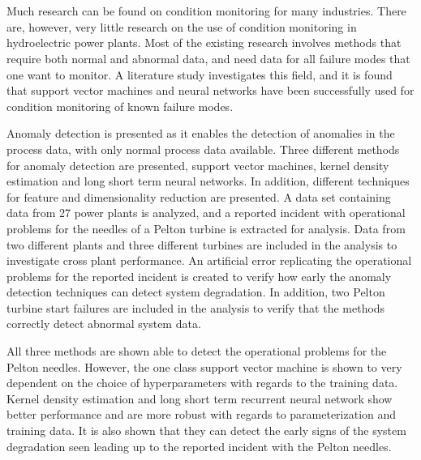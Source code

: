 \chapter*{\englishabstractname}

Much research can be found on condition monitoring for many industries. There are, however, very little research on the use of condition monitoring in hydroelectric power plants. Most of the existing research involves methods that require both normal and abnormal data, and need data for all failure modes that one want to monitor. A literature study investigates this field, and it is found that support vector machines and neural networks have been successfully used for condition monitoring of known failure modes. 

Anomaly detection is presented as it enables the detection of anomalies in the process data, with only normal process data available. Three different methods for anomaly detection are presented, support vector machines, kernel density estimation and long short term neural networks. In addition, different techniques for feature and dimensionality reduction are presented. A data set containing data from 27 power plants is analyzed, and a reported incident with operational problems for the needles of a Pelton turbine is extracted for analysis. Data from two different plants and three different turbines are included in the analysis to investigate cross plant performance. An artificial error replicating the operational problems for the reported incident is created to verify how early the anomaly detection techniques can detect system degradation. In addition, two Pelton turbine start failures are included in the analysis to verify that the methods correctly detect abnormal system data. 

All three methods are shown able to detect the operational problems for the Pelton needles. However, the one class support vector machine is shown to very dependent on the choice of hyperparameters with regards to the training data. Kernel density estimation and long short term recurrent neural network show better performance and are more robust with regards to parameterization and training data. It is also shown that they can detect the early signs of the system degradation seen leading up to the reported incident with the Pelton needles. 

\clearpage
